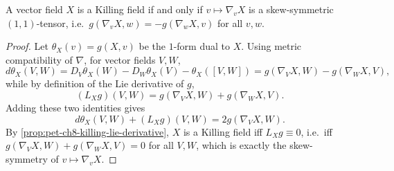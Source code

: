 \begin{proposition}[Proposition 8.1.2]
  \label{prop:pet-ch8-killing-skew-symmetric}
  A vector field $X$ is a Killing field if and only if $v\mapsto\nabla_vX$ is a
  skew-symmetric $(1,1)$-tensor, i.e.\ $g(\nabla_vX,w)=-g(\nabla_wX,v)$ for all
  $v,w$.
\end{proposition}
\begin{proof}
  Let $\theta_X(v)=g(X,v)$ be the $1$-form dual to $X$. Using metric compatibility
  of $\nabla$, for vector fields $V,W$,
  \[
    d\theta_X(V,W)=D_V\theta_X(W)-D_W\theta_X(V)-\theta_X([V,W])
    =g(\nabla_VX,W)-g(\nabla_WX,V),
  \]
  while by definition of the Lie derivative of $g$,
  \[
    (L_Xg)(V,W)=g(\nabla_VX,W)+g(\nabla_WX,V).
  \]
  Adding these two identities gives
  \[
    d\theta_X(V,W)+(L_Xg)(V,W)=2g(\nabla_VX,W).
  \]
  By \cref{prop:pet-ch8-killing-lie-derivative}, $X$ is a Killing field iff
  $L_Xg\equiv0$, i.e.\ iff $g(\nabla_VX,W)+g(\nabla_WX,V)=0$ for all $V,W$, which
  is exactly the skew-symmetry of $v\mapsto\nabla_vX$.
\end{proof}

